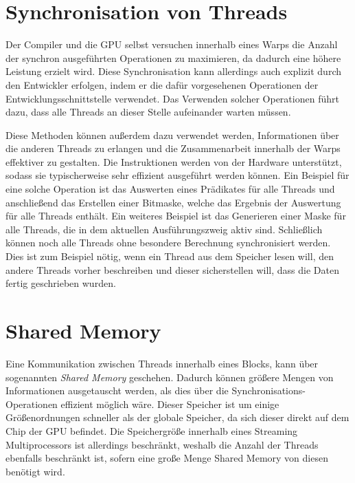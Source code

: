 \section{Synchronisation von Threads}
\label{sec:synchronisation_von_threads}

Der Compiler und die GPU selbst versuchen innerhalb eines Warps die Anzahl der synchron ausgeführten Operationen zu maximieren, da dadurch eine höhere Leistung erzielt wird. \cite{Nickolls2009}
Diese Synchronisation kann allerdings auch explizit durch den Entwickler erfolgen, indem er die dafür vorgesehenen Operationen der Entwicklungsschnittstelle verwendet.
Das Verwenden solcher Operationen führt dazu, dass alle Threads an dieser Stelle aufeinander warten müssen.

Diese Methoden können außerdem dazu verwendet werden, Informationen über die anderen Threads zu erlangen und die Zusammenarbeit innerhalb der Warps effektiver zu gestalten.
Die Instruktionen werden von der Hardware unterstützt, sodass sie typischerweise sehr effizient ausgeführt werden können.
Ein Beispiel für eine solche Operation ist das Auswerten eines Prädikates für alle Threads und anschließend das Erstellen einer Bitmaske, welche das Ergebnis der Auswertung für alle Threads enthält.
Ein weiteres Beispiel ist das Generieren einer Maske für alle Threads, die in dem aktuellen Ausführungszweig aktiv sind.
Schließlich können noch alle Threads ohne besondere Berechnung synchronisiert werden.
Dies ist zum Beispiel nötig, wenn ein Thread aus dem Speicher lesen will, den andere Threads vorher beschreiben und dieser sicherstellen will, dass die Daten fertig geschrieben wurden. \cite{Lin2018}

\section{Shared Memory}

Eine Kommunikation zwischen Threads innerhalb eines Blocks, kann über sogenannten \emph{Shared Memory} geschehen.
Dadurch können größere Mengen von Informationen ausgetauscht werden, als dies über die Synchronisations-Operationen effizient möglich wäre.
Dieser Speicher ist um einige Größenordnungen schneller als der globale Speicher, da sich dieser direkt auf dem Chip der GPU befindet. \cite{Harris2013}
Die Speichergröße innerhalb eines Streaming Multiprocessors ist allerdings beschränkt, weshalb die Anzahl der Threads ebenfalls beschränkt ist, sofern eine große Menge Shared Memory von diesen benötigt wird.

